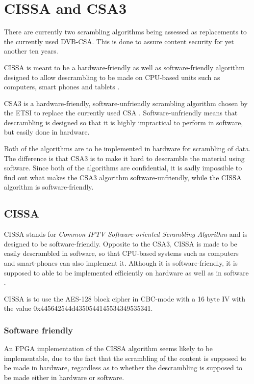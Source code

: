 \chapter{CISSA and CSA3}
There are currently two scrambling algorithms being assessed as replacements to 
the currently used DVB-CSA. This is done to assure content security for 
yet another ten years.


CISSA is meant to be a hardware-friendly as well as software-friendly algorithm 
designed to allow descrambling to be made on CPU-based units such as computers, 
smart phones and tablets \citep[p. 9]{DVB:2013}.

CSA3 is a hardware-friendly, software-unfriendly scrambling algorithm chosen by 
the ETSI to replace the currently used CSA \citep[pp. 6--7]{DVB:2013}. 
Software-unfriendly means that descrambling is designed so that it is highly 
impractical to perform in software, but easily done in hardware.

Both of the algorithms are to be implemented in hardware for scrambling of data.
The difference is that CSA3 is to make it hard to descramble the material using 
software. Since both of the algorithms are confidential, it is sadly impossible 
to find out what makes the CSA3 algorithm software-unfriendly, while the CISSA 
algorithm is software-friendly. 

\section{CISSA}
CISSA stands for \emph{Common IPTV Software-oriented Scrambling Algorithm} and 
is designed to be software-friendly. Opposite to the CSA3, CISSA is made to be 
easily descrambled in software, so that CPU-based systems such as computers and 
smart-phones can also implement it.  Although it is software-friendly, it is 
supposed to able to be implemented efficiently on hardware as well as in 
software \citep[p. 9]{DVB:2013}.

CISSA is to use the AES-128 block cipher in CBC-mode with a 16 byte IV with the 
value 0x445642544d4350544145534349535341. \citep[p. 11]{DVB:2013}

\subsection{Software friendly}
An FPGA implementation of the CISSA algorithm seems likely to be implementable, 
due to the fact that the scrambling of the content is supposed to be made in 
hardware, regardless as to whether the descrambling is supposed to be made 
either in hardware or software.

